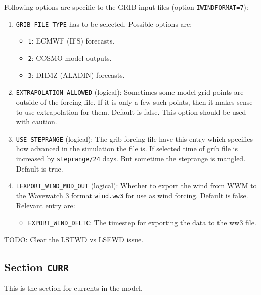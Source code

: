 \documentclass[12pt]{amsart}
\begin{document}
Following options are specific to the GRIB input files (option {\tt IWINDFORMAT=7}):
\begin{enumerate}
\item {\tt GRIB\_FILE\_TYPE} has to be selected. Possible options are:
  \begin{itemize}
  \item {\tt 1}: ECMWF (IFS) forecasts.
  \item {\tt 2}: COSMO model outputs.
  \item {\tt 3}: DHMZ (ALADIN) forecasts.
  \end{itemize}
\item {\tt EXTRAPOLATION\_ALLOWED} (logical): Sometimes some model grid points are outside of the forcing file. If it is only a few such points, then it makes sense to use extrapolation for them. Default is false. This option should be used with caution.
\item {\tt USE\_STEPRANGE} (logical): The grib forcing file have this entry which specifies how advanced in the simulation the file is. If selected time of grib file is increased by {\tt steprange/24} days. But sometime the steprange is mangled. Default is true.
\item {\tt LEXPORT\_WIND\_MOD\_OUT} (logical): Whether to export the wind from WWM to the Wavewatch 3 format {\tt wind.ww3} for use as wind forcing. Default is false. Relevant entry are:
  \begin{itemize}
  \item {\tt EXPORT\_WIND\_DELTC}: The timestep for exporting the data to the ww3 file.
  \end{itemize}
  
\end{enumerate}

TODO: Clear the LSTWD vs LSEWD issue.





\subsection{Section {\tt CURR}}
This is the section for currents in the model.
\end{document}
